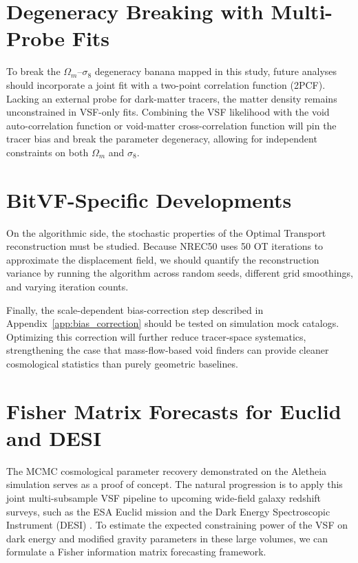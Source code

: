 \documentclass[12pt]{report}
\begin{document}
\section{Degeneracy Breaking with Multi-Probe Fits}

To break the $\Omega_m$--$\sigma_8$ degeneracy banana mapped in this study, future analyses should incorporate a joint fit with a two-point correlation function (2PCF). Lacking an external probe for dark-matter tracers, the matter density remains unconstrained in VSF-only fits. Combining the VSF likelihood with the void auto-correlation function or void-matter cross-correlation function will pin the tracer bias and break the parameter degeneracy, allowing for independent constraints on both $\Omega_m$ and $\sigma_8$.

\section{BitVF-Specific Developments}

On the algorithmic side, the stochastic properties of the Optimal Transport reconstruction must be studied. Because NREC50 uses 50 OT iterations to approximate the displacement field, we should quantify the reconstruction variance by running the algorithm across random seeds, different grid smoothings, and varying iteration counts. 

Finally, the scale-dependent bias-correction step described in Appendix~\ref{app:bias_correction} should be tested on simulation mock catalogs. Optimizing this correction will further reduce tracer-space systematics, strengthening the case that mass-flow-based void finders can provide cleaner cosmological statistics than purely geometric baselines.

\section{Fisher Matrix Forecasts for Euclid and DESI}
\label{sec:fisher_forecasts}

The MCMC cosmological parameter recovery demonstrated on the Aletheia simulation serves as a proof of concept. The natural progression is to apply this joint multi-subsample VSF pipeline to upcoming wide-field galaxy redshift surveys, such as the ESA Euclid mission \citep{Euclid2011} and the Dark Energy Spectroscopic Instrument (DESI) \citep{DESI2016}. To estimate the expected constraining power of the VSF on dark energy and modified gravity parameters in these large volumes, we can formulate a Fisher information matrix forecasting framework.
\end{document}
